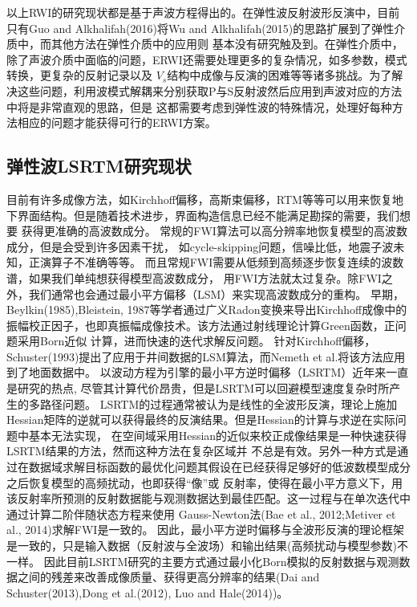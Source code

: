 以上RWI的研究现状都是基于声波方程得出的。在弹性波反射波形反演中，目前只有Guo and
Alkhalifah(2016)\cite{Guo2016}将Wu and
Alkhalifah(2015)\cite{Wu2015b}的思路扩展到了弹性介质中，而其他方法在弹性介质中的应用则
基本没有研究触及到。在弹性介质中，除了声波介质中面临的问题，ERWI还需要处理更多的复杂情况，如多参数，模式转换，更复杂的反射记录以及
$V_s$结构中成像与反演的困难等等诸多挑战。为了解决这些问题，利用波模式解耦来分别获取P与S反射波然后应用到声波对应的方法中将是非常直观的思路，但是
这都需要考虑到弹性波的特殊情况，处理好每种方法相应的问题才能获得可行的ERWI方案。

\subsection{弹性波LSRTM研究现状}

目前有许多成像方法，如Kirchhoff偏移，高斯束偏移，RTM等等可以用来恢复地下界面结构。但是随着技术进步，界面构造信息已经不能满足勘探的需要，我们想要
获得更准确的高波数成分。
常规的FWI算法可以高分辨率地恢复模型的高波数成分，但是会受到许多因素干扰，
如cycle-skipping问题，信噪比低，地震子波未知，正演算子不准确等等。
而且常规FWI需要从低频到高频逐步恢复连续的波数谱，如果我们单纯想获得模型高波数成分，
用FWI方法就太过复杂。除FWI之外，我们通常也会通过最小平方偏移（LSM）来实现高波数成分的重构。
早期，Beylkin(1985)\cite{Beylkin},Bleistein,
1987等学者通过广义Radon变换来导出Kirchhoff成像中的振幅校正因子，也即真振幅成像技术。该方法通过射线理论计算Green函数，正问题采用Born近似
计算，进而快速的迭代求解反问题。
针对Kirchhoff偏移，Schuster(1993)\cite{Schuster1993}提出了应用于井间数据的LSM算法，而Nemeth et al.\cite{Nemeth1999}将该方法应用到了地面数据中。
以波动方程为引擎的最小平方逆时偏移（LSRTM）近年来一直是研究的热点,
尽管其计算代价昂贵，但是LSRTM可以回避模型速度复杂时所产生的多路径问题。
LSRTM的过程通常被认为是线性的全波形反演，理论上施加Hessian矩阵的逆就可以获得最终的反演结果。但是Hessian的计算与求逆在实际问题中基本无法实现，
在空间域采用Hessian的近似来校正成像结果是一种快速获得LSRTM结果的方法\cite{ChaventEtAl1999,shin2001improved,Symes2008}，然而这种方法在复杂区域并
不总是有效。另外一种方式是通过在数据域求解目标函数的最优化问题其假设在已经获得足够好的低波数模型成分之后恢复模型的高频扰动，也即获得“像”或
反射率，使得在最小平方意义下，用该反射率所预测的反射数据能与观测数据达到最佳匹配。这一过程与在单次迭代中通过计算二阶伴随状态方程来使用
Gauss-Newton法(Bae et al., 2012\cite{bae2012frequency};Metiver et al.,
2014\cite{Metivier2014})求解FWI是一致的。
因此，最小平方逆时偏移与全波形反演的理论框架是一致的，只是输入数据（反射波与全波场）和输出结果(高频扰动与模型参数)不一样。
因此目前LSRTM研究的主要方式通过最小化Born模拟的反射数据与观测数据之间的残差来改善成像质量、获得更高分辨率的结果(Dai and
Schuster(2013)\cite{Dai2013},Dong et al.(2012)\cite{Dong2012}, Luo and
Hale(2014)\cite{Luo2014})。

